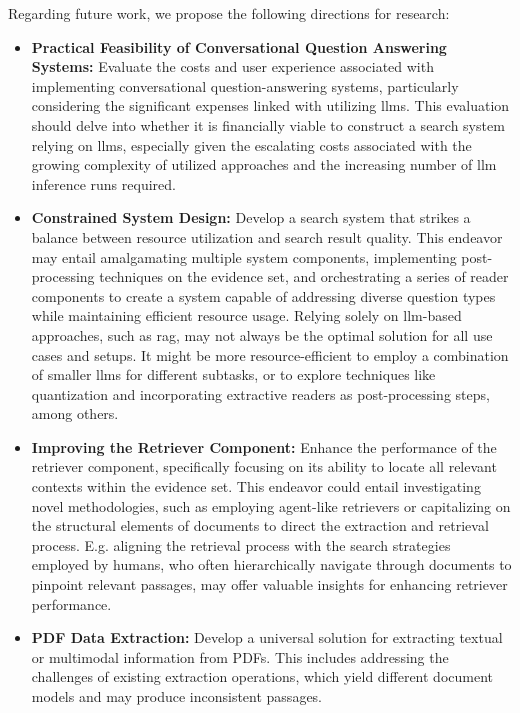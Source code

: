 \vspace{\baselineskip}
\noindent Regarding future work, we propose the following directions for research:
\begin{itemize}
    \item \textbf{Practical Feasibility of Conversational Question Answering Systems:} Evaluate the costs and user experience associated with implementing conversational question-answering systems, particularly considering the significant expenses linked with utilizing \gls{llm}s. This evaluation should delve into whether it is financially viable to construct a search system relying on \gls{llm}s, especially given the escalating costs associated with the growing complexity of utilized approaches and the increasing number of \gls{llm} inference runs required. 

    \item \textbf{Constrained System Design:} Develop a search system that strikes a balance between resource utilization and search result quality. This endeavor may entail amalgamating multiple system components, implementing post-processing techniques on the evidence set, and orchestrating a series of reader components to create a system capable of addressing diverse question types while maintaining efficient resource usage. Relying solely on \gls{llm}-based approaches, such as \gls{rag}, may not always be the optimal solution for all use cases and setups. It might be more resource-efficient to employ a combination of smaller \gls{llm}s for different subtasks, or to explore techniques like quantization and incorporating extractive readers as post-processing steps, among others.

    \item \textbf{Improving the Retriever Component:} Enhance the performance of the retriever component, specifically focusing on its ability to locate all relevant contexts within the evidence set. This endeavor could entail investigating novel methodologies, such as employing agent-like retrievers or capitalizing on the structural elements of documents to direct the extraction and retrieval process. E.g. aligning the retrieval process with the search strategies employed by humans, who often hierarchically navigate through documents to pinpoint relevant passages, may offer valuable insights for enhancing retriever performance.

    \item \textbf{PDF Data Extraction:} Develop a universal solution for extracting textual or multimodal information from PDFs. This includes addressing the challenges of existing extraction operations, which yield different document models and may produce inconsistent passages. 
\end{itemize}